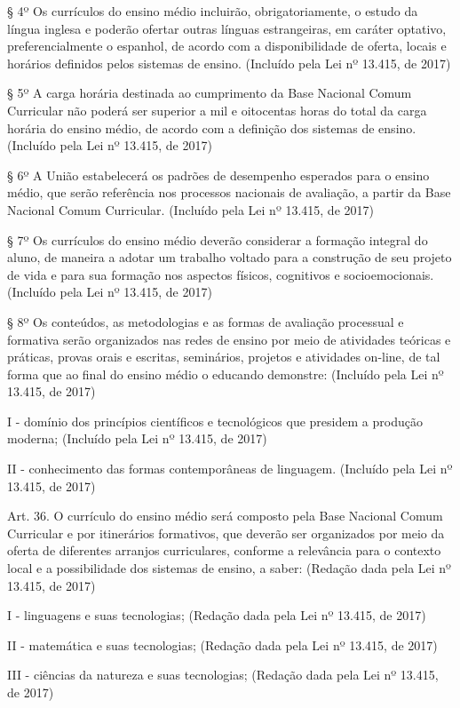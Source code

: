 \documentclass[
]{book}
\begin{document}
§ 4º Os currículos do ensino médio incluirão, obrigatoriamente, o estudo da língua inglesa e poderão ofertar outras línguas estrangeiras, em caráter optativo, preferencialmente o espanhol, de acordo com a disponibilidade de oferta, locais e horários definidos pelos sistemas de ensino. (Incluído pela Lei nº 13.415, de 2017)

§ 5º A carga horária destinada ao cumprimento da Base Nacional Comum Curricular não poderá ser superior a mil e oitocentas horas do total da carga horária do ensino médio, de acordo com a definição dos sistemas de ensino. (Incluído pela Lei nº 13.415, de 2017)

§ 6º A União estabelecerá os padrões de desempenho esperados para o ensino médio, que serão referência nos processos nacionais de avaliação, a partir da Base Nacional Comum Curricular. (Incluído pela Lei nº 13.415, de 2017)

§ 7º Os currículos do ensino médio deverão considerar a formação integral do aluno, de maneira a adotar um trabalho voltado para a construção de seu projeto de vida e para sua formação nos aspectos físicos, cognitivos e socioemocionais. (Incluído pela Lei nº 13.415, de 2017)

§ 8º Os conteúdos, as metodologias e as formas de avaliação processual e formativa serão organizados nas redes de ensino por meio de atividades teóricas e práticas, provas orais e escritas, seminários, projetos e atividades on-line, de tal forma que ao final do ensino médio o educando demonstre: (Incluído pela Lei nº 13.415, de 2017)

I - domínio dos princípios científicos e tecnológicos que presidem a produção moderna; (Incluído pela Lei nº 13.415, de 2017)

II - conhecimento das formas contemporâneas de linguagem. (Incluído pela Lei nº 13.415, de 2017)

Art. 36. O currículo do ensino médio será composto pela Base Nacional Comum Curricular e por itinerários formativos, que deverão ser organizados por meio da oferta de diferentes arranjos curriculares, conforme a relevância para o contexto local e a possibilidade dos sistemas de ensino, a saber: (Redação dada pela Lei nº 13.415, de 2017)

I - linguagens e suas tecnologias; (Redação dada pela Lei nº 13.415, de 2017)

II - matemática e suas tecnologias; (Redação dada pela Lei nº 13.415, de 2017)

III - ciências da natureza e suas tecnologias; (Redação dada pela Lei nº 13.415, de 2017)
\end{document}
